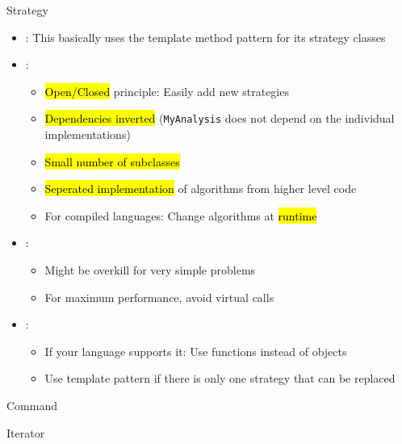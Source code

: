 \begin{frame}{Strategy}
	\begin{itemize}
		\item {}: This basically uses the template method pattern for its strategy classes
		\item {}:
		\begin{itemize}
			\item \hl{Open/Closed} principle: Easily add new strategies
			\item \hl{Dependencies inverted} (\texttt{MyAnalysis} does not depend on the individual implementations)
			\item \hl{Small number of subclasses}
			\item \hl{Seperated implementation} of algorithms from higher level code
			\item For compiled languages: Change algorithms at \hl{runtime}
		\end{itemize}
		\item {}: 
			\begin{itemize}
				\item Might be overkill for very simple problems
				\item For maximum performance, avoid virtual calls
			\end{itemize}
		\item {}:
		\begin{itemize}
			\item If your language supports it: Use functions instead of objects 
			\item Use template pattern if there is only one strategy that can be replaced
		\end{itemize}
	\end{itemize}
\end{frame}

\begin{frame}{Command}
	
\end{frame}

\begin{frame}{Iterator}
	
\end{frame}